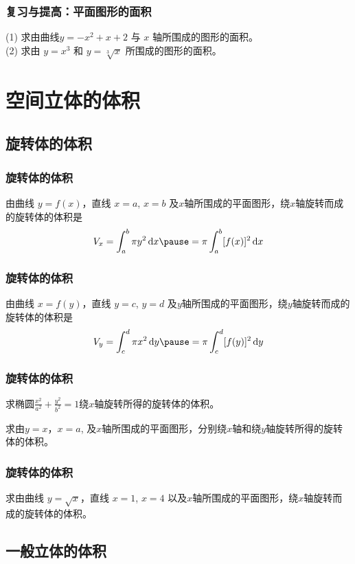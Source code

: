 \documentclass[14pt,notheorems,leqno,xcolor={rgb}]{beamer} %
\begin{document}
\begin{oframe}
\frametitle{复习与提高：平面图形的面积}
\begin{review}
(1) 求由曲线$y=-x^2+x+2$ 与 $x$ 轴所围成的图形的面积。\\\pause
(2) 求由 $y=x^3$ 和 $y=\sqrt[3]x$ 所围成的图形的面积。
\end{review}
\end{oframe}

\section{空间立体的体积}

\subsection{旋转体的体积}

\begin{frame}
\frametitle{旋转体的体积}
由曲线 $y=f(x)$，直线 $x=a$, $x=b$ 及$x$轴所围成的平面图形，绕$x$轴旋转而成的旋转体的体积是\pause
\[ V_x =\int_a^b\pi y^2\d x\pause=\pi\int_a^b[f(x)]^2\d x \]
\end{frame}

\begin{frame}
\frametitle{旋转体的体积}
由曲线 $x=f(y)$，直线 $y=c$, $y=d$ 及$y$轴所围成的平面图形，绕$y$轴旋转而成的旋转体的体积是\pause
\[ V_y =\int_c^d\pi x^2\d y\pause=\pi\int_c^d[f(y)]^2\d y \]
\end{frame}

\begin{frame}
\frametitle{旋转体的体积}
\begin{example}
求椭圆$\displaystyle\frac{x^2}{a^2}+\frac{y^2}{b^2}=1$绕$x$轴旋转所得的旋转体的体积。
\end{example}
\vpause
\begin{example}%
求由$y=x$，$x=a$, 及$x$轴所围成的平面图形，分别绕$x$轴和绕$y$轴旋转所得的旋转体的体积。
\end{example}
\end{frame}

\begin{oframe}
\frametitle{旋转体的体积}
\begin{exercise}
求由曲线 $y=\sqrt{x}$，直线 $x=1$, $x=4$ 以及$x$轴所围成的平面图形，绕$x$轴旋转而成的旋转体的体积。
\end{exercise}
\end{oframe}

\subsection{一般立体的体积}
\end{document}
